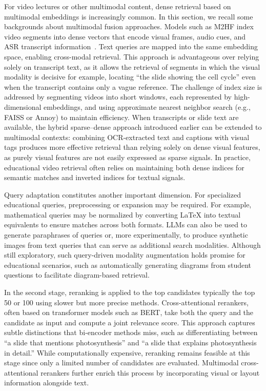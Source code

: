 For video lectures or other multimodal content, dense retrieval based on multimodal embeddings is increasingly common. In this section, we recall some backgrounds about multimodal fusion approaches. Models such as M2HF index video segments into dense vectors that encode visual frames, audio cues, and ASR transcript information~\cite{liu2022m2hf}. Text queries are mapped into the same embedding space, enabling cross-modal retrieval. This approach is advantageous over relying solely on transcript text, as it allows the retrieval of segments in which the visual modality is decisive for example, locating ``the slide showing the cell cycle'' even when the transcript contains only a vague reference. The challenge of index size is addressed by segmenting videos into short windows, each represented by high-dimensional embeddings, and using approximate nearest neighbor search (e.g., FAISS or Annoy) to maintain efficiency. When transcripts or slide text are available, the hybrid sparse--dense approach introduced earlier can be extended to multimodal contexts: combining OCR-extracted text and captions with visual tags produces more effective retrieval than relying solely on dense visual features, as purely visual features are not easily expressed as sparse signals. In practice, educational video retrieval often relies on maintaining both dense indices for semantic matches and inverted indices for textual signals.

Query adaptation constitutes another important dimension. For specialized educational queries, preprocessing or expansion may be required. For example, mathematical queries may be normalized by converting LaTeX into textual equivalents to ensure matches across both formats. LLMs can also be used to generate paraphrases of queries or, more experimentally, to produce synthetic images from text queries that can serve as additional search modalities. Although still exploratory, such query-driven modality augmentation holds promise for educational scenarios, such as automatically generating diagrams from student questions to facilitate diagram-based retrieval.

In the second stage, reranking is applied to the top candidates typically the top 50 or 100 using slower but more precise methods. Cross-attentional rerankers, often based on transformer models such as BERT, take both the query and the candidate as input and compute a joint relevance score. This approach captures subtle distinctions that bi-encoder methods miss, such as differentiating between “a slide that mentions photosynthesis” and “a slide that explains photosynthesis in detail.” While computationally expensive, reranking remains feasible at this stage since only a limited number of candidates are evaluated. Multimodal cross-attentional rerankers further enrich this process by incorporating visual or layout information alongside text.

